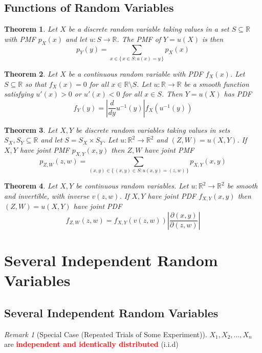 \documentclass{article}
\newcommand{\R}{\mathbb{R}}
\newcommand{\bfred}[1]{\textcolor{red}{\textbf{#1}}}
\theoremstyle{plain}
\newtheorem{thm}{Theorem}[section]
\theoremstyle{definition}
\theoremstyle{remark}
\newtheorem*{rem}{Remark}
\begin{document}
\subsection{Functions of Random Variables}

\begin{thm}
    Let $X$ be a discrete random variable taking values in a set $S\subseteq\R$ with PMF $p_X(x)$ and let $u:S\rightarrow\R$. The PMF of $Y=u(X)$ is then \[p_Y(y)=\sum_{x\in\{\,x\in S:u(x)=y\,\}}p_X(x)\]
\end{thm}

\begin{thm}
    Let $X$ be a continuous random variable with PDF $f_X(x)$. Let $S\subseteq\R$ so that $f_X(x)=0$ for all $x\in\R\setminus S$. Let $u: \R\rightarrow\R$ be a smooth function satisfying $u'(x)>0$ or $u'(x)<0$ for all $x\in S$. Then $Y=u(X)$ has PDF \[f_Y(y) = \left|\frac{d}{dy}u^{-1}(y)\right|f_X(u^{-1}(y))\]
\end{thm}

\begin{thm}
    Let $X,Y$ be discrete random variables taking values in sets $S_X,S_Y\subseteq\R$ and let $S=S_X\times S_Y$. Let $u: \R^2\rightarrow\R^2$ and $(Z,W)=u(X,Y)$. If $X,Y$ have joint PMF $p_{X,Y}(x,y)$ then $Z,W$ have joint PMF \[p_{Z,W}(z,w)=\sum_{(x,y)\in\bigr\{\,(x,y)\in S:u(x,y)=(z,w)\,\bigr\}}p_{X,Y}(x,y)\]
\end{thm}

\begin{thm}
    Let $X,Y$ be continuous random variables. Let $u:\R^2\rightarrow\R^2$ be smooth and invertible, with inverse $v(z,w)$. If $X,Y$ have joint PDF $f_{X,Y}(x,y)$ then $(Z,W)=u(X,Y)$ have joint PDF \[f_{Z,W}(z,w)=f_{X,Y}(v(z,w))\left\lvert\frac{\partial(x,y)}{\partial(z,w)}\right\rvert\]
\end{thm}

\section{Several Independent Random Variables}

\subsection{Several Independent Random Variables}

\begin{rem}[Special Case (Repeated Trials of Some Experiment)]
    $X_1,X_2,\dotsc,X_n$ are \bfred{independent and identically distributed} (i.i.d)
\end{rem}
\end{document}
